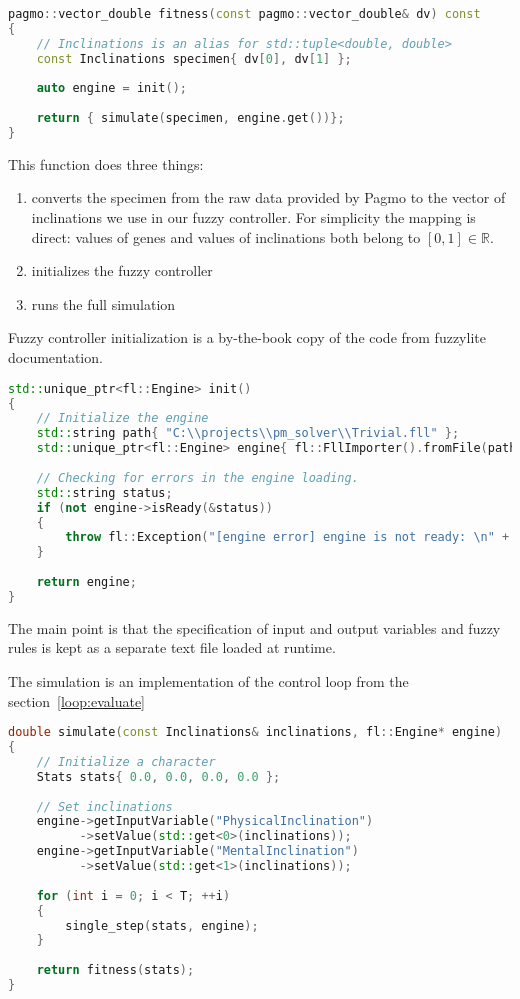 \documentclass[12pt, a4paper]{report}
\begin{document}
	\begin{lstlisting}[language=c++]
pagmo::vector_double fitness(const pagmo::vector_double& dv) const
{
	// Inclinations is an alias for std::tuple<double, double>
	const Inclinations specimen{ dv[0], dv[1] };
	
	auto engine = init();
	
	return { simulate(specimen, engine.get())};
}
	\end{lstlisting}
	
	This function does three things:
	
	\begin{enumerate}
		\item converts the specimen from the raw data provided by Pagmo to the vector of inclinations we use in our fuzzy controller. For simplicity the mapping is direct: values of genes and values of inclinations both belong to $[0, 1] \in \mathbb{R}$.
		\item initializes the fuzzy controller
		\item runs the full simulation
	\end{enumerate}
	
	Fuzzy controller initialization is a by-the-book copy of the code from fuzzylite documentation.
	
	\begin{lstlisting}[language=c++]
std::unique_ptr<fl::Engine> init()
{
	// Initialize the engine
	std::string path{ "C:\\projects\\pm_solver\\Trivial.fll" };
	std::unique_ptr<fl::Engine> engine{ fl::FllImporter().fromFile(path) };
	
	// Checking for errors in the engine loading.
	std::string status;
	if (not engine->isReady(&status))
	{
		throw fl::Exception("[engine error] engine is not ready: \n" + status);
	}
	
	return engine;
}
	\end{lstlisting}
	
	The main point is that the specification of input and output variables and fuzzy rules is kept as a separate text file loaded at runtime.
	
	The simulation is an implementation of the control loop from the section~\ref{loop:evaluate}
	
	\begin{lstlisting}[language=c++]
double simulate(const Inclinations& inclinations, fl::Engine* engine)
{
	// Initialize a character
	Stats stats{ 0.0, 0.0, 0.0, 0.0 };
	
	// Set inclinations
	engine->getInputVariable("PhysicalInclination")
		  ->setValue(std::get<0>(inclinations));
	engine->getInputVariable("MentalInclination")
	      ->setValue(std::get<1>(inclinations));
	
	for (int i = 0; i < T; ++i)
	{
		single_step(stats, engine);
	}
	
	return fitness(stats);
}
	\end{lstlisting}
	
\end{document}

